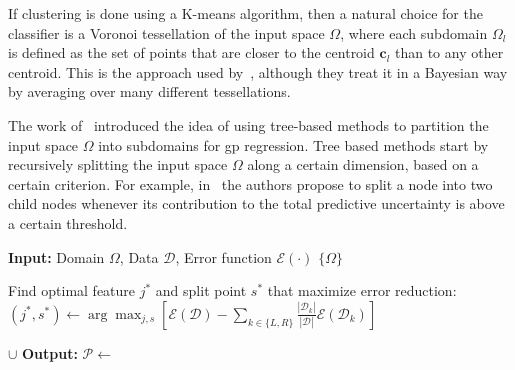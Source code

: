 \smallskip
If clustering is done using a K-means algorithm, then a natural choice for the classifier is a Voronoi tessellation of the input space $\Omega$, where each subdomain $\Omega_l$ is defined as the set of points that are closer to the centroid $\mathbf{c}_l$ than to any other centroid. This is the approach used by~\cite{kim2005}, although they treat it in a Bayesian way by averaging over many different tessellations.

\smallskip
The work of~\cite{Gramacy2008} introduced the idea of using tree-based methods to partition the input space $\Omega$ into subdomains for \gls{gp} regression. Tree based methods start by recursively splitting the input space $\Omega$ along a certain dimension, based on a certain criterion. For example, in~\cite{Bilionis2012} the authors propose to split a node into two child nodes whenever its contribution to the total predictive uncertainty is above a certain threshold.


\begin{algorithm}[htbp]
\caption{}
\label{alg:tree_compact}
\begin{algorithmic}[1]
\State \textbf{Input:} Domain $\Omega$, Data $\mathcal{D}$, Error function $\mathcal{E}(\cdot)$
\vspace{0.1cm}
        \State \Return $\{\Omega\}$
    \EndIf
    
    \State Find optimal feature $j^*$ and split point $s^*$ that maximize error reduction:
    \State \quad $(j^*, s^*) \gets \arg\max_{j, s} \left[ \mathcal{E}(\mathcal{D}) - \sum_{k \in \{L, R\}} \frac{|\mathcal{D}_k|}{|\mathcal{D}|} \mathcal{E}(\mathcal{D}_k) \right]$
    
    \State \Return {} $\cup$ 
\EndFunction
\State \textbf{Output:} $\mathcal{P} \gets$ 
\end{algorithmic}
\end{algorithm}


